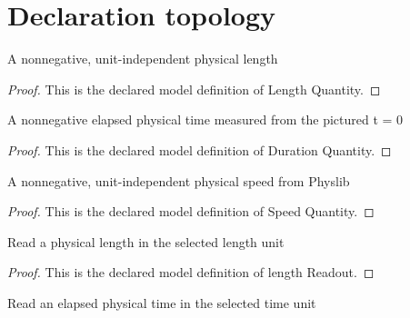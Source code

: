 \section{Declaration topology}
\begin{definition}
  \label{def:physics:phyx-mini-0728:phyxminiproblems-problemphyxmini0728-lengthquantity}
  A nonnegative, unit-independent physical length
\end{definition}
\begin{proof}
  This is the declared model definition of Length Quantity.
\end{proof}
\begin{definition}
  \label{def:physics:phyx-mini-0728:phyxminiproblems-problemphyxmini0728-durationquantity}
  A nonnegative elapsed physical time measured from the pictured t = 0
\end{definition}
\begin{proof}
  This is the declared model definition of Duration Quantity.
\end{proof}
\begin{definition}
  \label{def:physics:phyx-mini-0728:phyxminiproblems-problemphyxmini0728-speedquantity}
  A nonnegative, unit-independent physical speed from Physlib
\end{definition}
\begin{proof}
  This is the declared model definition of Speed Quantity.
\end{proof}
\begin{definition}
  \label{def:physics:phyx-mini-0728:phyxminiproblems-problemphyxmini0728-lengthreadout}
  Read a physical length in the selected length unit
\end{definition}
\begin{proof}
  This is the declared model definition of length Readout.
\end{proof}
\begin{definition}
  \label{def:physics:phyx-mini-0728:phyxminiproblems-problemphyxmini0728-durationreadout}
  Read an elapsed physical time in the selected time unit
\end{definition}
